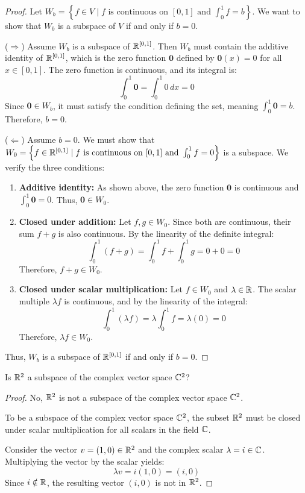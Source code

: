 \begin{proof}
	Let $W_b = \left\{f \in V \mid f \text{ is continuous on } [0, 1] \text{ and } \int_0^1 f = b\right\}$. We want to show that $W_b$ is a subspace of $V$ if and only if $b = 0$.
	
	($\Rightarrow$) Assume $W_b$ is a subspace of $\mathbb{R}^{[0,1]}$. Then $W_b$ must contain the additive identity of $\mathbb{R}^{[0,1]}$, which is the zero function $\mathbf{0}$ defined by $\mathbf{0}(x) = 0$ for all $x \in [0, 1]$. The zero function is continuous, and its integral is:
	\[ \int_0^1 \mathbf{0} = \int_0^1 0 \, dx = 0 \]
	Since $\mathbf{0} \in W_b$, it must satisfy the condition defining the set, meaning $\int_0^1 \mathbf{0} = b$. Therefore, $b = 0$.
	
	($\Leftarrow$) Assume $b = 0$. We must show that $W_0 = \left\{f \in \mathbb{R}^{[0,1]} \mid f \text{ is continuous on } [0, 1] \text{ and } \int_0^1 f = 0\right\}$ is a subspace. We verify the three conditions:
	\begin{enumerate}
		\item \textbf{Additive identity:} As shown above, the zero function $\mathbf{0}$ is continuous and $\int_0^1 \mathbf{0} = 0$. Thus, $\mathbf{0} \in W_0$.
		
		\item \textbf{Closed under addition:} Let $f, g \in W_0$. Since both are continuous, their sum $f + g$ is also continuous. By the linearity of the definite integral:
		\[ \int_0^1 (f + g) = \int_0^1 f + \int_0^1 g = 0 + 0 = 0 \]
		Therefore, $f + g \in W_0$.
		
		\item \textbf{Closed under scalar multiplication:} Let $f \in W_0$ and $\lambda \in \mathbb{R}$. The scalar multiple $\lambda f$ is continuous, and by the linearity of the integral:
		\[ \int_0^1 (\lambda f) = \lambda \int_0^1 f = \lambda(0) = 0 \]
		Therefore, $\lambda f \in W_0$.
	\end{enumerate}
	Thus, $W_b$ is a subspace of $\mathbb{R}^{[0,1]}$ if and only if $b = 0$.
\end{proof}
\begin{question}
	Is $\mathbb{R}^2$ a subspace of the complex vector space $\mathbb{C}^2$?
\end{question}
\begin{proof}
	No, $\mathbb{R}^2$ is not a subspace of the complex vector space $\mathbb{C}^2$.
	
	To be a subspace of the complex vector space $\mathbb{C}^2$, the subset $\mathbb{R}^2$ must be closed under scalar multiplication for all scalars in the field $\mathbb{C}$. 
	
	Consider the vector $v = (1, 0) \in \mathbb{R}^2$ and the complex scalar $\lambda = i \in \mathbb{C}$. 
	Multiplying the vector by the scalar yields:
	\[ \lambda v = i(1, 0) = (i, 0) \]
	Since $i \notin \mathbb{R}$, the resulting vector $(i, 0)$ is not in $\mathbb{R}^2$. 
\end{proof}
